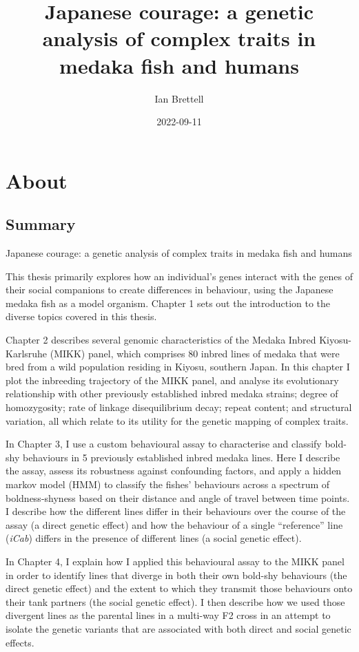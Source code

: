 \documentclass[
]{book}
\title{Japanese courage: a genetic analysis of complex traits in medaka fish and humans}
\author{Ian Brettell}
\date{2022-09-11}
\begin{document}
\maketitle

{
\setcounter{tocdepth}{1}
\tableofcontents
}
\hypertarget{about}{%
\chapter*{About}\label{about}}

\hypertarget{summary}{%
\section{Summary}\label{summary}}

Japanese courage: a genetic analysis of complex traits in medaka fish and humans

This thesis primarily explores how an individual's genes interact with the genes of their social companions to create differences in behaviour, using the Japanese medaka fish as a model organism. Chapter 1 sets out the introduction to the diverse topics covered in this thesis.

Chapter 2 describes several genomic characteristics of the Medaka Inbred Kiyosu-Karlsruhe (MIKK) panel, which comprises 80 inbred lines of medaka that were bred from a wild population residing in Kiyosu, southern Japan. In this chapter I plot the inbreeding trajectory of the MIKK panel, and analyse its evolutionary relationship with other previously established inbred medaka strains; degree of homozygosity; rate of linkage disequilibrium decay; repeat content; and structural variation, all which relate to its utility for the genetic mapping of complex traits.

In Chapter 3, I use a custom behavioural assay to characterise and classify bold-shy behaviours in 5 previously established inbred medaka lines. Here I describe the assay, assess its robustness against confounding factors, and apply a hidden markov model (HMM) to classify the fishes' behaviours across a spectrum of boldness-shyness based on their distance and angle of travel between time points. I describe how the different lines differ in their behaviours over the course of the assay (a direct genetic effect) and how the behaviour of a single ``reference'' line (\emph{iCab}) differs in the presence of different lines (a social genetic effect).

In Chapter 4, I explain how I applied this behavioural assay to the MIKK panel in order to identify lines that diverge in both their own bold-shy behaviours (the direct genetic effect) and the extent to which they transmit those behaviours onto their tank partners (the social genetic effect). I then describe how we used those divergent lines as the parental lines in a multi-way F2 cross in an attempt to isolate the genetic variants that are associated with both direct and social genetic effects.
\end{document}
